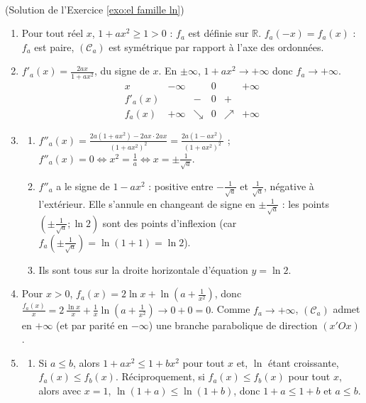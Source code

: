 \begin{corrige}
\begin{sol} ~ \\
(Solution de l'Exercice \ref{exo:el famille ln})
\begin{enumerate}
\item Pour tout r\'eel $x$, $1 + a x^2 \geq 1 > 0$ : $f_a$ est d\'efinie sur $\mathbb{R}$. $f_a(-x) = f_a(x)$ : $f_a$ est paire,
      $(\mathscr{C}_a)$ est sym\'etrique par rapport \`a l'axe des ordonn\'ees.
\item $f'_a(x) = \frac{2ax}{1 + ax^2}$, du signe de $x$. En $\pm\infty$, $1 + ax^2 \to +\infty$ donc $f_a \to +\infty$.
      \[
      \begin{array}{c|ccccc}
      x & -\infty & & 0 & & +\infty \\ \hline
      f'_a(x) & & - & 0 & + & \\ \hline
      f_a(x) & +\infty & \searrow & 0 & \nearrow & +\infty
      \end{array}
      \]
\item \begin{enumerate}
      \item $f''_a(x) = \frac{2a(1 + ax^2) - 2ax \cdot 2ax}{(1 + ax^2)^2} = \frac{2a(1 - ax^2)}{(1+ax^2)^2}$ ;
            $f''_a(x) = 0 \iff x^2 = \frac{1}{a} \iff x = \pm\frac{1}{\sqrt{a}}$.
      \item $f''_a$ a le signe de $1 - ax^2$ : positive entre $-\frac{1}{\sqrt{a}}$ et $\frac{1}{\sqrt{a}}$, n\'egative \`a l'ext\'erieur.
            Elle s'annule en changeant de signe en $\pm\frac{1}{\sqrt{a}}$ : les points $\left(\pm\frac{1}{\sqrt{a}} ; \ln 2\right)$
            sont des points d'inflexion (car $f_a\left(\pm\frac{1}{\sqrt{a}}\right) = \ln(1 + 1) = \ln 2$).
      \item Ils sont tous sur la droite horizontale d'\'equation $y = \ln 2$.
      \end{enumerate}
\item Pour $x > 0$, $f_a(x) = 2\ln x + \ln\left(a + \frac{1}{x^2}\right)$, donc $\frac{f_a(x)}{x} = 2\,\frac{\ln x}{x} + \frac{1}{x}\ln\left(a + \frac{1}{x^2}\right) \to 0 + 0 = 0$.
      Comme $f_a \to +\infty$, $(\mathscr{C}_a)$ admet en $+\infty$ (et par parit\'e en $-\infty$) une branche parabolique de direction $(x'Ox)$.
\item \begin{enumerate}
      \item Si $a \leq b$, alors $1 + ax^2 \leq 1 + bx^2$ pour tout $x$ et, $\ln$ \'etant croissante, $f_a(x) \leq f_b(x)$.
            R\'eciproquement, si $f_a(x) \leq f_b(x)$ pour tout $x$, alors avec $x = 1$, $\ln(1+a) \leq \ln(1+b)$, donc $1 + a \leq 1 + b$ et $a \leq b$.

\end{enumerate}
\end{enumerate}
\end{sol}
\end{corrige}
